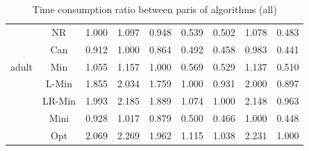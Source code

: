 \documentclass[11pt]{book}
\begin{document}
\begin{table}
\begin{tabular}{|c|c|c|c|c|c|c|c|c|}
    \hline
    \multirow{5}{*}{adult}
         & NR & 1.000 & 1.097 & 0.948 & 0.539 & 0.502 & 1.078 & 0.483 \\                                                                                                                                             
         & Can & 0.912 & 1.000 & 0.864 & 0.492 & 0.458 & 0.983 & 0.441 \\                                                                                                                                            
         & Min & 1.055 & 1.157 & 1.000 & 0.569 & 0.529 & 1.137 & 0.510 \\                                                                                                                                            
         & L-Min & 1.855 & 2.034 & 1.759 & 1.000 & 0.931 & 2.000 & 0.897 \\                                                                                                                                          
         & LR-Min & 1.993 & 2.185 & 1.889 & 1.074 & 1.000 & 2.148 & 0.963 \\                                                                                                                                         
         & Mini & 0.928 & 1.017 & 0.879 & 0.500 & 0.466 & 1.000 & 0.448 \\                                                                                                                                           
         & Opt & 2.069 & 2.269 & 1.962 & 1.115 & 1.038 & 2.231 & 1.000 \\
    	
    \hline

    
\end{tabular}

	\caption{Time consumption ratio between paris of algorithms (all)}

\end{table}
\end{document}
